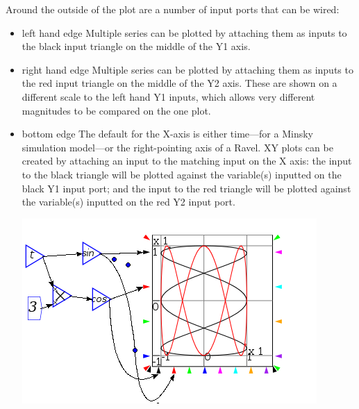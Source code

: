 Around the outside of the plot are a number of input ports that can
be wired:
\begin{itemize}
\item left hand edge Multiple series can be plotted by attaching them as
inputs to the black input triangle on the middle of the Y1 axis.
\item right hand edge Multiple series can be plotted by attaching them
as inputs to the red input triangle on the middle of the Y2 axis.
These are shown on a different scale to the left hand Y1 inputs, which
allows very different magnitudes to be compared on the one plot. 
\item bottom edge The default for the X-axis is either time---for a Minsky
simulation model---or the right-pointing axis of a Ravel. XY plots
can be created by attaching an input to the matching input on the
X axis: the input to the black triangle will be plotted against the
variable(s) inputted on the black Y1 input port; and the input to
the red triangle will be plotted against the variable(s) inputted
on the red Y2 input port.
\begin{center}
\includegraphics{images/plotLissajous} 
\par\end{center}


\end{itemize}
